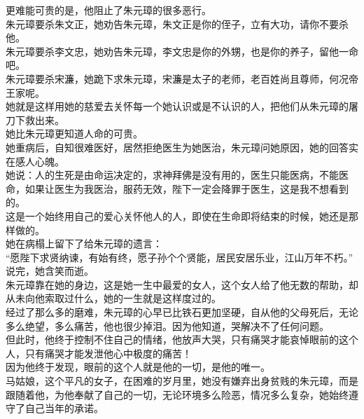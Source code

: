 \begin{multicols}{\theparacolNo}
更难能可贵的是，他阻止了朱元璋的很多恶行。\\

朱元璋要杀朱文正，她劝告朱元璋，朱文正是你的侄子，立有大功，请你不要杀他。\\

朱元璋要杀李文忠，她劝告朱元璋，李文忠是你的外甥，也是你的养子，留他一命吧。\\

朱元璋要杀宋濂，她跪下求朱元璋，宋濂是太子的老师，老百姓尚且尊师，何况帝王家呢。\\

她就是这样用她的慈爱去关怀每一个她认识或是不认识的人，把他们从朱元璋的屠刀下救出来。\\

她比朱元璋更知道人命的可贵。\\

她重病后，自知很难医好，居然拒绝医生为她医治，朱元璋问她原因，她的回答实在感人心魄。\\

她说：人的生死是由命运决定的，求神拜佛是没有用的，医生只能医病，不能医命，如果让医生为我医治，服药无效，陛下一定会降罪于医生，这是我不想看到的。\\

这是一个始终用自己的爱心关怀他人的人，即使在生命即将结束的时候，她还是那样做的。\\

她在病榻上留下了给朱元璋的遗言：\\

“愿陛下求贤纳谏，有始有终，愿子孙个个贤能，居民安居乐业，江山万年不朽。”\\

说完，她含笑而逝。\\

朱元璋靠在她的身边，这是她一生中最爱的女人，这个女人给了他无数的帮助，却从未向他索取过什么，她的一生就是这样度过的。\\

经过了那么多的磨难，朱元璋的心早已比铁石更加坚硬，自从他的父母死后，无论多么绝望，多么痛苦，他也很少掉泪。因为他知道，哭解决不了任何问题。\\

但此时，他终于控制不住自己的情绪，他放声大哭，只有痛哭才能哀悼眼前的这个人，只有痛哭才能发泄他心中极度的痛苦！\\

因为他终于发现，眼前的这个人就是他的一切，是他的唯一。\\

马姑娘，这个平凡的女子，在困难的岁月里，她没有嫌弃出身贫贱的朱元璋，而是跟随着他，为他奉献了自己的一切，无论环境多么险恶，情况多么复杂，她始终遵守了自己当年的承诺。\\


\end{multicols}
